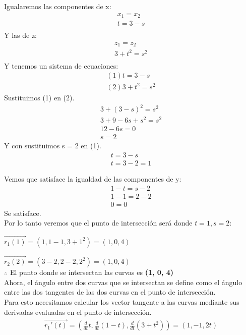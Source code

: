 \documentclass[12pt]{article}
\begin{document}
Igualaremos las componentes de x:
\begin{align*}
   x_1 = x_2 \\
   t =  3-s \\
\end{align*}
Y las de z:
\begin{align*}
   z_1 = z_2 \\
   3+t^2  =  s^{2} \\
\end{align*}
Y tenemos un sistema de ecuaciones:
\begin{align*}
  (1) t =  3-s \\
  (2) 3+t^2  =  s^{2}
\end{align*}
Sustituimos (1) en (2).
\begin{align*}
   3+(3-s)^2  =  s^{2} \\
   3+9-6s+s^2  =  s^{2} \\
   12 -6s =  0 \\
   s = 2
\end{align*}
Y con sustituimos s = 2 en (1).
\begin{align*}
   t =  3-s \\
  t = 3-2 = 1 
\end{align*}

Vemos que satisface la igualdad de las componentes de y:
\begin{align*}
   1-t = s-2 \\
   1-1  = 2-2 \\
   0 = 0
\end{align*}
Se satisface.\\
Por lo tanto veremos que el punto de intersección será donde $t=1, s=2$: \\
\item $\vec{r_1(1)}=(1,1-1,3+1^2) = (1, 0, 4)$

\item $\vec{r_2(2)}=(3-2,2-2,2^2) = (1, 0, 4)$ \\
  $\therefore$ El punto donde se intersectan las curvas es \textbf{(1, 0, 4)}
  \\
  Ahora, el ángulo entre dos curvas que se intersectan se define como el ángulo entre las dos tangentes de las dos curvas en el punto de intersección.\\
  Para esto necesitamos calcular los  vector tangente a las curvas mediante sus derivadas evaluadas en el punto de intersección.
\begin{align*}
    \vec{r_1'(t)} = \left( \frac{d}{dt} t, \frac{d}{dt}  (1-t), \frac{d}{dt} (3+t^2) \right) =  (1, -1, 2t)
\end{align*}
\end{document}

